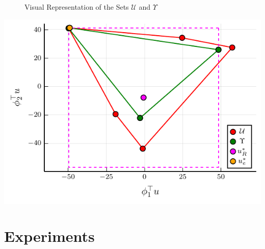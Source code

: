 \documentclass{beamer}
\begin{document}
\begin{frame}
\begin{figure}
\begin{center}
\begin{minipage}{0.45\linewidth}
  \end{minipage}
  \end{center}
\caption{Visual Representation of the Sets $\mathcal{U}$ and $\Upsilon$}
\end{figure}

\end{frame}

\begin{frame}
	\begin{center}
		\includegraphics[width=\textwidth, height=\textheight]{../../pres_roil/plots/visual_solve_cheb.pdf}
	\end{center}
\end{frame}

\section*{Experiments}
\end{document}
